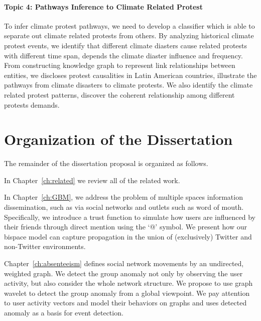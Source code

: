 \paragraph{Topic 4: Pathways Inference to Climate Related Protest}
To infer climate protest pathways, we need to develop a classifier which is able to separate out climate related protests from others. By analyzing historical climate protest events, we identify that different climate diasters cause related protests with different time span, depends the climate diaster influence and frequency. From constructing knowledge graph to represent link relationships between entities, we discloses protest causalities in Latin American countries, illustrate the pathways from climate disasters to climate protests. We also identify the climate related protest patterns, discover the coherent relationship among different protests demands.



\section{Organization of the Dissertation}
The remainder of the dissertation proposal is organized as follows.

In Chapter~\ref{ch:related} we review all of the related work.

In Chapter~\ref{ch:GBM}, we address the problem of multiple spaces information dissemination, such as via social networks and outlets such as word of mouth. Specifically, we introduce a trust function to simulate how users are influenced by their friends through direct mention using the `@' symbol. We present how our bispace model can capture propagation in the union of (exclusively) Twitter and non-Twitter environments.

Chapter~\ref{ch:absenteeism} defines social network movements by an undirected, weighted graph. We detect the group anomaly not only by observing the user activity, but also consider the whole network structure. We propose to use graph wavelet to detect the group anomaly from a global viewpoint. We pay attention to user activity vectors and model their behaviors on graphs and uses detected anomaly as a basis for event detection.


